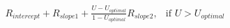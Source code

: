 \documentclass[preview]{standalone}
\begin{document}
\begin{align*}
R_{intercept} + R_{slope1} + \frac{U-U_{optimal}}{1-U_{optimal}}R_{slope2}, & \text{if } U > U_{optimal}
\end{align*}
\end{document}
